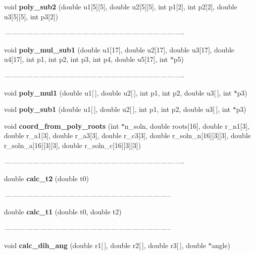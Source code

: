 \begin{CompactItemize}
void {\bf poly\_\-sub2} (double u1[5][5], double u2[5][5], int p1[2], int p2[2], double u3[5][5], int p3[2])
\begin{CompactList}\small\item\em ---------------------------------------------------------------------------- \item\end{CompactList}\item 
void {\bf poly\_\-mul\_\-sub1} (double u1[17], double u2[17], double u3[17], double u4[17], int p1, int p2, int p3, int p4, double u5[17], int $\ast$p5)
\begin{CompactList}\small\item\em ---------------------------------------------------------------------------- \item\end{CompactList}\item 
void {\bf poly\_\-mul1} (double u1[$\,$], double u2[$\,$], int p1, int p2, double u3[$\,$], int $\ast$p3)
\item 
void {\bf poly\_\-sub1} (double u1[$\,$], double u2[$\,$], int p1, int p2, double u3[$\,$], int $\ast$p3)
\item 
void {\bf coord\_\-from\_\-poly\_\-roots} (int $\ast$n\_\-soln, double roots[16], double r\_\-n1[3], double r\_\-a1[3], double r\_\-a3[3], double r\_\-c3[3], double r\_\-soln\_\-n[16][3][3], double r\_\-soln\_\-a[16][3][3], double r\_\-soln\_\-c[16][3][3])
\begin{CompactList}\small\item\em ---------------------------------------------------------------------------- \item\end{CompactList}\item 
double {\bf calc\_\-t2} (double t0)
\begin{CompactList}\small\item\em ----------------------------------------------------------------------- \item\end{CompactList}\item 
double {\bf calc\_\-t1} (double t0, double t2)
\begin{CompactList}\small\item\em ----------------------------------------------------------------------- \item\end{CompactList}\item 
void {\bf calc\_\-dih\_\-ang} (double r1[$\,$], double r2[$\,$], double r3[$\,$], double $\ast$angle)

\end{CompactItemize}
